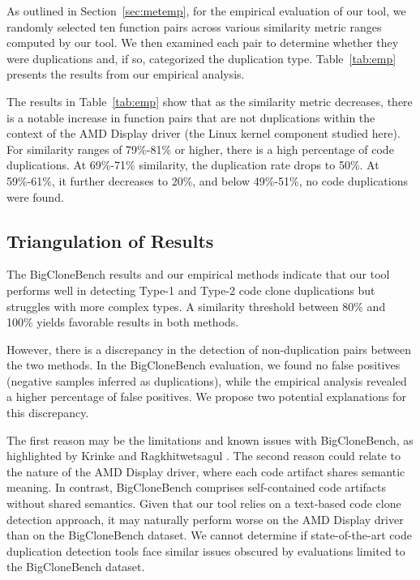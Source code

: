 As outlined in Section~\ref{sec:metemp}, for the empirical evaluation of our tool, we randomly selected ten function pairs across various similarity metric ranges computed by our tool. We then examined each pair to determine whether they were duplications and, if so, categorized the duplication type. Table~\ref{tab:emp} presents the results from our empirical analysis.



The results in Table~\ref{tab:emp} show that as the similarity metric decreases, 
there is a notable increase in function pairs that are not duplications within 
the context of the AMD Display driver (the Linux kernel component studied here). 
For similarity ranges of 79\%-81\% or higher, there is a high 
percentage of code duplications. At 69\%-71\% similarity, the duplication rate 
drops to 50\%. At 59\%-61\%, it further decreases to 20\%, and below 49\%-51\%, 
no code duplications were found.

\subsection{Triangulation of Results}

The BigCloneBench results and our empirical methods indicate that our tool performs well in detecting Type-1 and Type-2 code clone duplications but struggles with more complex types. A similarity threshold between 80\% and 100\% yields favorable results in both methods.

However, there is a discrepancy in the detection of non-duplication pairs between the two methods. In the BigCloneBench evaluation, we found no false positives (negative samples inferred as duplications), while the empirical analysis revealed a higher percentage of false positives. We propose two potential explanations for this discrepancy.

The first reason may be the limitations and known issues with BigCloneBench, as highlighted by Krinke and Ragkhitwetsagul \citep{bigfail}. The second reason could relate to the nature of the AMD Display driver, where each code artifact shares semantic meaning. In contrast, BigCloneBench comprises self-contained code artifacts without shared semantics. Given that our tool relies on a text-based code clone detection approach, it may naturally perform worse on the AMD Display driver than on the BigCloneBench dataset. We cannot determine if state-of-the-art code duplication detection tools face similar issues obscured by evaluations limited to the BigCloneBench dataset.
